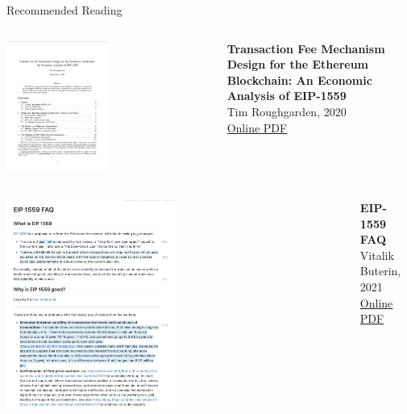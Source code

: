 \documentclass[]{beamer}
\begin{document}
\begin{frame}{Recommended Reading}
\begin{columns}
	\begin{column}{0.3\textwidth}
	\center
	\includegraphics[width=0.5\textwidth , frame]{../assets/images/Roughgarden_cover.png}
	\end{column}
	\begin{column}{0.7\textwidth}
	\textbf{Transaction Fee Mechanism Design for the Ethereum Blockchain: An Economic Analysis of EIP-1559} \\
	Tim Roughgarden, 2020 \\
	\link \href{https://timroughgarden.org/papers/eip1559.pdf}{Online PDF}
	\end{column}
\end{columns}
\begin{columns}
	\begin{column}{0.3\textwidth}
	\center
	\includegraphics[width=0.5\textwidth , frame]{../assets/images/eip_1559_cover.png}
	\end{column}
	\begin{column}{0.7\textwidth}
	\textbf{EIP-1559 FAQ} \\
	Vitalik Buterin, 2021 \\
	\link \href{https://notes.ethereum.org/@vbuterin/eip-1559-faq}{Online PDF}
	\end{column}
\end{columns}
\end{frame}
\end{document}
